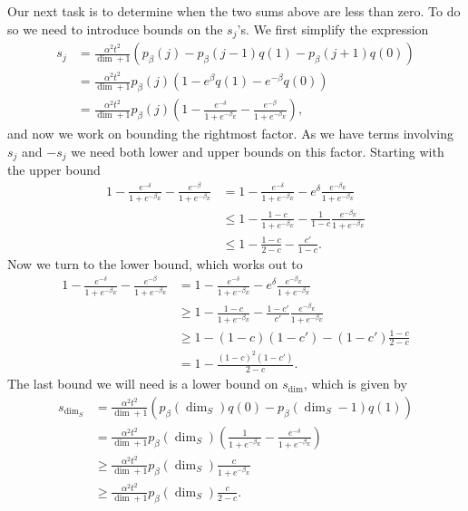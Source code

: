 \documentclass{article}
\newcommand{\parens}[1]{\left( #1 \right)}
\begin{document}
Our next task is to determine when the two sums above are less than zero. To do so we need to introduce bounds on the $s_j$'s. We first simplify the expression
\begin{align}
    s_j &= \frac{\alpha^2 t^2}{\dim + 1}(p_{\beta}(j) - p_{\beta}(j - 1) q(1) - p_{\beta}(j + 1)q(0) ) \\
    &= \frac{\alpha^2 t^2}{\dim + 1}p_{\beta}(j) \parens{1 - e^{\beta} q(1) - e^{-\beta} q(0)} \\
    &= \frac{\alpha^2 t^2}{\dim + 1}p_{\beta}(j) \parens{1 -\frac{e^{-\delta}}{1 + e^{-\beta_E}} - \frac{e^{-\beta}}{1 + e^{-\beta_E}}},
\end{align}
and now we work on bounding the rightmost factor. As we have terms involving $s_j$ and $-s_j$ we need both lower and upper bounds on this factor. Starting with the upper bound
\begin{align}
    1 -\frac{e^{-\delta}}{1 + e^{-\beta_E}} - \frac{e^{-\beta}}{1 + e^{-\beta_E}} &= 1 - \frac{e^{-\delta}}{1 + e^{-\beta_E}} - e^{\delta} \frac{e^{-\beta_E}}{1 + e^{-\beta_E}} \\
    &\le 1 - \frac{1 - c}{1 + e^{-\beta_E}} - \frac{1}{1 - c} \frac{e^{-\beta_E}}{1 + e^{-\beta_E}} \\
    &\le 1 - \frac{1-c}{2-c} - \frac{c'}{1 - c}.
\end{align}
Now we turn to the lower bound, which works out to
\begin{align}1 -\frac{e^{-\delta}}{1 + e^{-\beta_E}} - \frac{e^{-\beta}}{1 + e^{-\beta_E}} &= 1 - \frac{e^{-\delta}}{1 + e^{-\beta_E}} - e^{\delta} \frac{e^{-\beta_E}}{1 + e^{-\beta_E}} \\
&\ge 1 - \frac{1- c}{1 + e^{-\beta_E}} - \frac{1 - c'}{c'} \frac{e^{-\beta_E}}{1 + e^{-\beta_E}} \\
&\ge 1 - (1- c) (1 - c') - (1 - c')\frac{1- c}{2 - c} \\
&= 1 - \frac{(1 - c)^2(1-c')}{2 - c}.
\end{align}
The last bound we will need is a lower bound on $s_{\dim}$, which is given by
\begin{align}
    s_{\dim_S} &= \frac{\alpha^2 t^2}{\dim + 1} (p_{\beta}(\dim_S) q(0) - p_{\beta}(\dim_S - 1) q(1)) \\
    &= \frac{\alpha^2 t^2}{\dim + 1} p_{\beta}(\dim_S) \left( \frac{1}{1 + e^{-\beta_E}} - \frac{e^{-\delta}}{1 + e^{-\beta_E}} \right) \\
    &\geq \frac{\alpha^2 t^2}{\dim + 1} p_{\beta}(\dim_S) \frac{c}{1 + e^{-\beta_E}} \\
    &\geq \frac{\alpha^2 t^2}{\dim + 1} p_{\beta}(\dim_S) \frac{c}{2 - c}.
\end{align}
\end{document}
